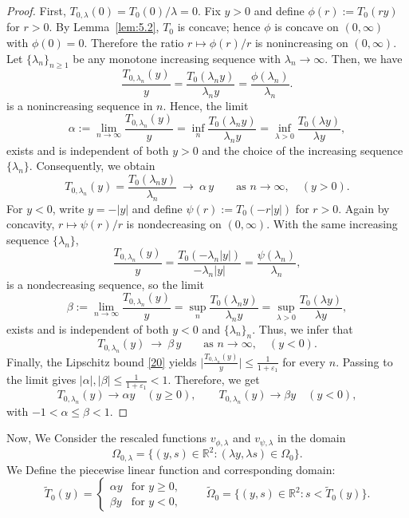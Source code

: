 \documentclass[
  sn-mathphys-num,
  colorlinks,
  linkcolor=darkmagenta,
  citecolor=rufous,
  urlcolor=zaffre,
  hypertexnames=false
]{sn-jnl}
\numberwithin{equation}{section}
\begin{document}
\begin{proof}
First, \(T_{0,\lambda}(0)=T_0(0)/\lambda=0\).
Fix \(y>0\) and define \(\phi(r):=T_0(r y)\) for \(r>0\).
By Lemma~\ref{lem:5.2}, \(T_0\) is concave; hence \(\phi\) is concave on \((0,\infty)\) with \(\phi(0)=0\).
Therefore the ratio \(r\mapsto \phi(r)/r\) is nonincreasing on \((0,\infty)\).\\
Let \(\{\lambda_n\}_{n\ge1}\) be any monotone increasing sequence with \(\lambda_n\to\infty\).
Then, we have
$$
\frac{T_{0,\lambda_n}(y)}{y}
=\frac{T_0(\lambda_n y)}{\lambda_n y}
=\frac{\phi(\lambda_n)}{\lambda_n}.
$$
is a nonincreasing sequence in \(n\).
Hence, the limit
$$
\alpha:=\lim_{n\to\infty}\frac{T_{0,\lambda_n}(y)}{y}
=\inf_{n}\frac{T_0(\lambda_n y)}{\lambda_n y}
=\inf_{\lambda>0}\frac{T_0(\lambda y)}{\lambda y},
$$
exists and is independent of both \(y>0\) and the choice of the increasing sequence \(\{\lambda_n\}\).
Consequently, we obtain
$$
T_{0,\lambda_n}(y)=\frac{T_0(\lambda_n y)}{\lambda_n}\ \longrightarrow\ \alpha\,y
\qquad\text{as }n\to\infty,\quad (y>0).
$$
For \(y<0\), write \(y=-|y|\) and define \(\psi(r):=T_0(-r|y|)\) for \(r>0\).
Again by concavity, \(r\mapsto \psi(r)/r\) is  nondecreasing on \((0,\infty)\).
With the same increasing sequence \(\{\lambda_n\}\),
$$
\frac{T_{0,\lambda_n}(y)}{y}
=\frac{T_0(-\lambda_n |y|)}{-\lambda_n |y|}
=\frac{\psi(\lambda_n)}{\lambda_n},
$$
is a nondecreasing sequence, so the limit
$$
\beta:=\lim_{n\to\infty}\frac{T_{0,\lambda_n}(y)}{y}
=\sup_{n}\frac{T_0(\lambda_n y)}{\lambda_n y}
=\sup_{\lambda>0}\frac{T_0(\lambda y)}{\lambda y},
$$
exists and is independent of both \(y<0\) and \(\{\lambda_n\}_n\).
Thus, we infer that
$$
T_{0,\lambda_n}(y)\ \longrightarrow\ \beta\,y
\qquad\text{as }n\to\infty,\quad (y<0).
$$
Finally, the Lipschitz bound \eqref{20} yields
\(
\bigl|\tfrac{T_{0,\lambda_n}(y)}{y}\bigr|\le \tfrac{1}{1+\varepsilon_1}
\)
for every \(n\).
Passing to the limit gives
\(|\alpha|,|\beta|\le \tfrac{1}{1+\varepsilon_1}<1\).
Therefore, we get
$$
T_{0,\lambda_n}(y)\to \alpha y \quad (y\ge0), 
\qquad
T_{0,\lambda_n}(y)\to \beta y \quad (y<0),
$$
with \(-1<\alpha\le \beta<1\).
\end{proof}
Now, We Consider the rescaled functions $v_{\phi,\lambda}$ and $v_{\psi,\lambda}$ in the domain
$$
\Omega_{0,\lambda} = \{(y,s) \in \mathbb{R}^2 : (\lambda y, \lambda s) \in \Omega_0\}.
$$
We Define the piecewise linear function and corresponding domain:
\begin{equation}\label{tild}
\tilde{T}_0(y) = 
\begin{cases}
\alpha y & \text{for } y \geq 0, \\
\beta y & \text{for } y < 0,
\end{cases}
\qquad
\tilde{\Omega}_0 = \{(y,s) \in \mathbb{R}^2 : s < \tilde{T}_0(y)\}.
\end{equation}
\end{document}
